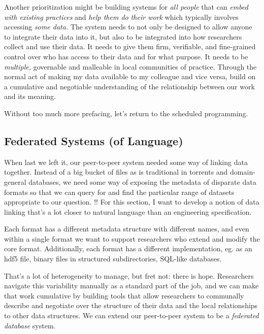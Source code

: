 \documentclass[10pt]{tufte-book}
\begin{document}
Another prioritization might be building systems for \emph{all people}
that can \emph{embed with existing practices} and \emph{help them do
their work} which typically involves accessing \emph{some data.} The
system needs to not only be designed to allow anyone to integrate their
data into it, but also to be integrated into how researchers collect and
use their data. It needs to give them firm, verifiable, and fine-grained
control over who has access to their data and for what purpose. It needs
to be \emph{multiple,} governable and malleable in local communities of
practice. Through the normal act of making my data available to my
colleague and vice versa, build on a cumulative and negotiable
understanding of the relationship between our work and its meaning.

Without too much more prefacing, let's return to the scheduled
programming. 




\subsection{Federated Systems (of
Language)}



 When last we left it, our peer-to-peer system needed some
way of linking data together. Instead of a big bucket of files as is
traditional in torrents and domain-general databases, we need some way
of exposing the metadata of disparate data formats so that we can query
for and find the particular range of datasets appropriate to our
question. !! For this section, I want to develop a notion of data
linking that's a lot closer to natural language than an engineering
specification.

Each format has a different metadata structure with different names, and
even within a single format we want to support researchers who extend
and modify the core format. Additionally, each format has a different
implementation, eg. as an hdf5 file, binary files in structured
subdirectories, SQL-like databases.

That's a lot of heterogeneity to manage, but fret not: there is hope.
Researchers navigate this variability manually as a standard part of the
job, and we can make that work cumulative by building tools that allow
researchers to communally describe and negotiate over the structure of
their data and the local relationships to other data structures. We can
extend our peer-to-peer system to be a \emph{federated database} system.
\end{document}
